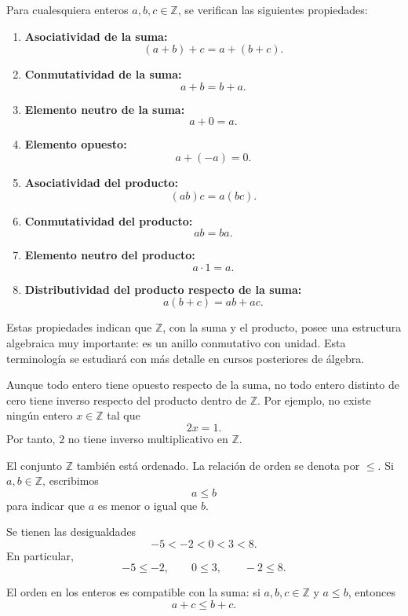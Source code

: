 \begin{proposicion}
Para cualesquiera enteros \(a,b,c\in\mathbb{Z}\), se verifican las siguientes propiedades:
\begin{enumerate}
  \item \textbf{Asociatividad de la suma:}
  \[
    (a+b)+c=a+(b+c).
  \]
  \item \textbf{Conmutatividad de la suma:}
  \[
    a+b=b+a.
  \]
  \item \textbf{Elemento neutro de la suma:}
  \[
    a+0=a.
  \]
  \item \textbf{Elemento opuesto:}
  \[
    a+(-a)=0.
  \]
  \item \textbf{Asociatividad del producto:}
  \[
    (ab)c=a(bc).
  \]
  \item \textbf{Conmutatividad del producto:}
  \[
    ab=ba.
  \]
  \item \textbf{Elemento neutro del producto:}
  \[
    a\cdot 1=a.
  \]
  \item \textbf{Distributividad del producto respecto de la suma:}
  \[
    a(b+c)=ab+ac.
  \]
\end{enumerate}
\end{proposicion}

Estas propiedades indican que \(\mathbb{Z}\), con la suma y el producto, posee una estructura algebraica muy importante: es un anillo conmutativo con unidad. Esta terminología se estudiará con más detalle en cursos posteriores de álgebra.

\begin{advertencia}
Aunque todo entero tiene opuesto respecto de la suma, no todo entero distinto de cero tiene inverso respecto del producto dentro de \(\mathbb{Z}\). Por ejemplo, no existe ningún entero \(x\in\mathbb{Z}\) tal que
\[
  2x=1.
\]
Por tanto, \(2\) no tiene inverso multiplicativo en \(\mathbb{Z}\).
\end{advertencia}

El conjunto \(\mathbb{Z}\) también está ordenado. La relación de orden se denota por \(\leq\). Si \(a,b\in\mathbb{Z}\), escribimos
\[
  a\leq b
\]
para indicar que \(a\) es menor o igual que \(b\).

\begin{ejemplo}
Se tienen las desigualdades
\[
  -5<-2<0<3<8.
\]
En particular,
\[
  -5\leq -2,
  \qquad
  0\leq 3,
  \qquad
  -2\leq 8.
\]
\end{ejemplo}

El orden en los enteros es compatible con la suma: si \(a,b,c\in\mathbb{Z}\) y \(a\leq b\), entonces
\[
  a+c\leq b+c.
\]


